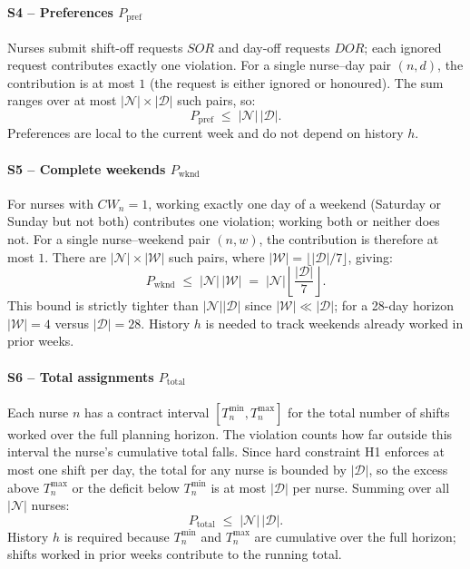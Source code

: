 \documentclass[11pt]{article}
\begin{document}
\paragraph{S4 -- Preferences $P_{\text{pref}}$}

Nurses submit shift-off requests $\mathit{SOR}$ and day-off requests
$\mathit{DOR}$; each ignored request contributes exactly one violation.
For a single nurse--day pair $(n,d)$, the contribution is at most $1$
(the request is either ignored or honoured). The sum ranges over at
most $|\mathcal{N}| \times |\mathcal{D}|$ such pairs, so:
\[
  P_{\text{pref}} \;\leq\; |\mathcal{N}|\,|\mathcal{D}|.
\]
Preferences are local to the current week and do not depend on
history $h$.

\paragraph{S5 -- Complete weekends $P_{\text{wknd}}$}

For nurses with $CW_n = 1$, working exactly one day of a weekend
(Saturday or Sunday but not both) contributes one violation; working
both or neither does not. For a single nurse--weekend pair $(n,w)$,
the contribution is therefore at most $1$. There are
$|\mathcal{N}| \times |\mathcal{W}|$ such pairs, where
$|\mathcal{W}| = \lfloor |\mathcal{D}|/7 \rfloor$, giving:
\[
  P_{\text{wknd}}
  \;\leq\;
  |\mathcal{N}|\,|\mathcal{W}|
  \;=\;
  |\mathcal{N}|\!\left\lfloor\frac{|\mathcal{D}|}{7}\right\rfloor.
\]
This bound is strictly tighter than $|\mathcal{N}||\mathcal{D}|$ since
$|\mathcal{W}| \ll |\mathcal{D}|$; for a 28-day horizon
$|\mathcal{W}| = 4$ versus $|\mathcal{D}| = 28$. History $h$ is
needed to track weekends already worked in prior weeks.

\paragraph{S6 -- Total assignments $P_{\text{total}}$}

Each nurse $n$ has a contract interval $[T^{\min}_n, T^{\max}_n]$ for
the total number of shifts worked over the full planning horizon. The
violation counts how far outside this interval the nurse's cumulative
total falls. Since hard constraint H1 enforces at most one shift per
day, the total for any nurse is bounded by $|\mathcal{D}|$, so the
excess above $T^{\max}_n$ or the deficit below $T^{\min}_n$ is at most
$|\mathcal{D}|$ per nurse. Summing over all $|\mathcal{N}|$ nurses:
\[
  P_{\text{total}} \;\leq\; |\mathcal{N}|\,|\mathcal{D}|.
\]
History $h$ is required because $T^{\min}_n$ and $T^{\max}_n$ are
cumulative over the full horizon; shifts worked in prior weeks
contribute to the running total.
\end{document}
